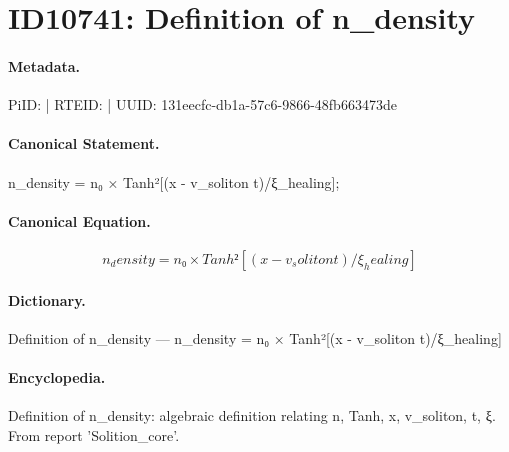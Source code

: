 \section*{ID10741: Definition of n\_density}
\paragraph{Metadata.}
PiID:  | RTEID:  | UUID: 131eecfc-db1a-57c6-9866-48fb663473de

\paragraph{Canonical Statement.}
n\_density = n₀ × Tanh²[(x - v\_soliton t)/ξ\_healing];

\paragraph{Canonical Equation.}
\[
n_density = n₀ × Tanh²[(x - v_soliton t)/ξ_healing]
\]

\paragraph{Dictionary.}
Definition of n\_density — n\_density = n₀ × Tanh²[(x - v\_soliton t)/ξ\_healing]

\paragraph{Encyclopedia.}
Definition of n\_density: algebraic definition relating n, Tanh, x, v\_soliton, t, ξ. From report 'Solition\_core'.
